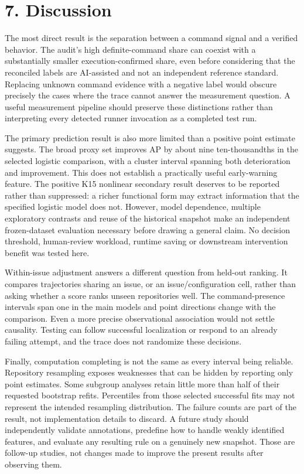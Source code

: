 \documentclass[10pt,a4paper]{article}
\begin{document}
\section{7. Discussion}
The most direct result is the separation between a command signal and a verified behavior. The audit's high definite-command share can coexist with a substantially smaller execution-confirmed share, even before considering that the reconciled labels are AI-assisted and not an independent reference standard. Replacing unknown command evidence with a negative label would obscure precisely the cases where the trace cannot answer the measurement question. A useful measurement pipeline should preserve these distinctions rather than interpreting every detected runner invocation as a completed test run.

The primary prediction result is also more limited than a positive point estimate suggests. The broad proxy set improves AP by about nine ten-thousandths in the selected logistic comparison, with a cluster interval spanning both deterioration and improvement. This does not establish a practically useful early-warning feature. The positive K15 nonlinear secondary result deserves to be reported rather than suppressed: a richer functional form may extract information that the specified logistic model does not. However, model dependence, multiple exploratory contrasts and reuse of the historical snapshot make an independent frozen-dataset evaluation necessary before drawing a general claim. No decision threshold, human-review workload, runtime saving or downstream intervention benefit was tested here.

Within-issue adjustment answers a different question from held-out ranking. It compares trajectories sharing an issue, or an issue/configuration cell, rather than asking whether a score ranks unseen repositories well. The command-presence intervals span one in the main models and point directions change with the comparison. Even a more precise observational association would not settle causality. Testing can follow successful localization or respond to an already failing attempt, and the trace does not randomize these decisions.

Finally, computation completing is not the same as every interval being reliable. Repository resampling exposes weaknesses that can be hidden by reporting only point estimates. Some subgroup analyses retain little more than half of their requested bootstrap refits. Percentiles from those selected successful fits may not represent the intended resampling distribution. The failure counts are part of the result, not implementation details to discard. A future study should independently validate annotations, predefine how to handle weakly identified features, and evaluate any resulting rule on a genuinely new snapshot. Those are follow-up studies, not changes made to improve the present results after observing them.
\end{document}
